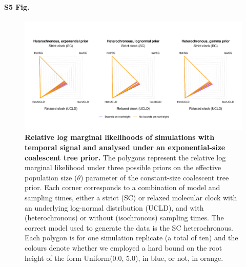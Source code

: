 \documentclass[10pt,letterpaper]{article}
\begin{document}
\paragraph*{S5 Fig.}
\begin{figure}[!h]
	\begin{center}
		\includegraphics[width=14cm]{sandbox_figures/coal_exponential_het_sims.pdf}\newline
		\vspace{-0.5cm}
		\caption{\textbf{Relative log marginal likelihoods of simulations with temporal signal and analysed under an exponential-size coalescent tree prior.} The polygons represent the relative log marginal likelihood under three possible priors on the effective population size ($\theta$) parameter of the constant-size coalescent tree prior. Each corner corresponds to a combination of model and sampling times, either a strict (SC) or relaxed molecular clock with an underlying log-normal distribution (UCLD), and with (heterochronous) or without (isochronous) sampling times. The correct model used to generate the data is the SC heterochronous. Each polygon is for one simulation replicate (a total of ten) and the colours denote whether we employed a hard bound on the root height of the form Uniform(0.0, 5.0), in blue, or not, in orange.} 
		\label{figure:exponential_heterochronous_polygons}
	\end{center}
\end{figure}
\end{document}
